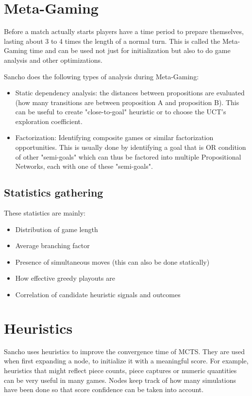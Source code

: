 \section{Meta-Gaming}
Before a match actually starts players have a time period to prepare themselves, lasting about 3 to 4 times the length of a normal turn. This is called the Meta-Gaming time and can be used not just for initialization but also to do game analysis and other optimizations.

Sancho does the following types of analysis during Meta-Gaming: 
\begin{itemize}
	\item Static dependency analysis: the distances between propositions are evaluated (how many transitions are between proposition A and proposition B). This can be useful to create "close-to-goal" heuristic or to choose the UCT's exploration coefficient. 
	
	\item Factorization: Identifying composite games or similar factorization opportunities. This is usually done by identifying a goal that is OR condition of other "semi-goals" which can thus be factored into multiple Propositional Networks, each with one of these "semi-goals".	
	
	 
\end{itemize}

\subsection{Statistics gathering}
These statistics are mainly:
\begin{itemize}
	\item Distribution of game length
	
	\item Average branching factor
	
	\item Presence of simultaneous moves (this can also be done statically)
	
	\item How effective greedy playouts are
	
	\item Correlation of candidate heuristic signals and outcomes
\end{itemize}



\section{Heuristics}
Sancho uses heuristics to improve the convergence time of MCTS. They are used when first expanding a node, to initialize it with a meaningful score. For example, heuristics that might reflect piece counts, piece captures or numeric quantities can be very useful in many games. Nodes keep track of how many simulations have been done so that score confidence can be taken into account. 

